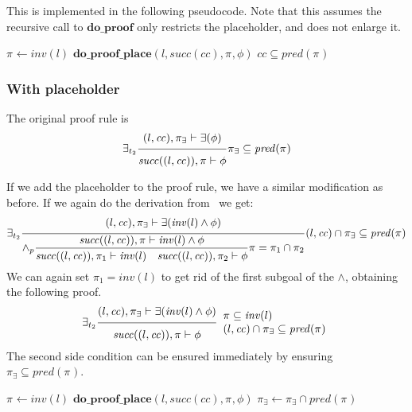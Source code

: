 \documentclass{article}
\newcommand{\proofrule}[3][]{#1 \frac{\raisebox{.7ex}{\normalsize{$#2$}}}
  {\raisebox{-1.0ex}{\normalsize{$#3$}}}}
\newcommand{\placeholder}[1][]{\pi_{#1}}
\newcommand{\loc}{l}
\newcommand{\region}{\mathit{cc}}
\newcommand{\suc}{\mathit{succ}}
\newcommand{\pre}{\mathit{pred}}
\newcommand{\inv}{\mathit{inv}}
\newcommand{\method}[1]{\ensuremath{\mathbf{#1}}}
\begin{document}
This is implemented in the following pseudocode. Note that this assumes the recursive
call to \method{do\_proof} only restricts the placeholder, and does not enlarge it.

\begin{algorithm}[H]
\caption{$\method{do\_proof\_exists}(\loc, \region, \exists(\phi))$}
\begin{algorithmic}
\STATE $\placeholder \gets \inv(\loc)$ 
\STATE $\method{do\_proof\_place}(\loc, \suc(\region), \placeholder, \phi)$
\RETURN $\region \subseteq \pre(\placeholder)$
\end{algorithmic}
\end{algorithm}

\subsubsection{With placeholder}
The original proof rule is
\[
%
\proofrule[\exists_{t_2}]
{(\loc, \region), \placeholder[\exists] \vdash \exists(\phi)}
{\suc((\loc, \region)), \placeholder \vdash \phi}
\placeholder[\exists] \subseteq \pre(\placeholder)
\]

If we add the placeholder to the proof rule, we have a similar modification as
before. If we again do the derivation from~\cite[Appendix C.2]{FC:14report} we get:
\[
\proofrule[\exists_{t_2}]
{(\loc, \region), \placeholder[\exists] \vdash \exists(\inv(\loc) \land \phi)}
{\proofrule[\land_p]
  {\suc((\loc, \region)), \placeholder \vdash \inv(\loc) \land \phi}
  {\suc((\loc, \region)), \placeholder[1] \vdash \inv(\loc)
   \quad \suc((\loc, \region)), \placeholder[2] \vdash \phi}
  \placeholder = \placeholder[1] \cap \placeholder[2]
}
(\loc, \region) \cap \placeholder[\exists] \subseteq \pre(\placeholder)
\]
We can again set $\placeholder[1] = \inv(\loc)$ to get rid of the first subgoal of the $\land$,
obtaining the following proof.
\[
\proofrule[\exists_{t_2}]
{(\loc, \region), \placeholder[\exists] \vdash \exists(\inv(\loc) \land \phi)}
{\suc((\loc, \region)), \placeholder \vdash \phi}
\begin{array}{l}
\placeholder \subseteq \inv(l)\\
(\loc, \region) \cap \placeholder[\exists] \subseteq \pre(\placeholder)
\end{array}
\]
The second side condition can be ensured immediately by ensuring $\placeholder[\exists] \subseteq \pre(\placeholder)$.

\begin{algorithm}[H]
\caption{$\method{do\_proof\_exists\_place}(\loc, \region, \placeholder[\exists], \exists(\phi))$}
\begin{algorithmic}
\STATE $\placeholder \gets \inv(\loc)$ 
\STATE $\method{do\_proof\_place}(\loc, \suc(\region), \placeholder, \phi)$
\STATE $\placeholder[\exists] \gets \placeholder[\exists] \cap \pre(\placeholder)$
\end{algorithmic}
\end{algorithm}
\end{document}
